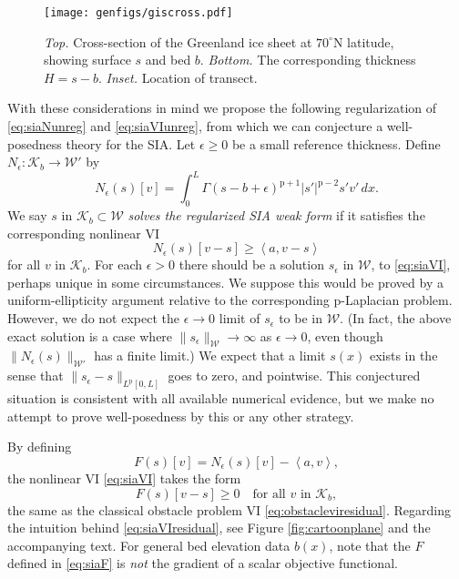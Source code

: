 \documentclass[letterpaper,final,12pt,reqno]{amsart}
\theoremstyle{claim}
\newcommand{\eps}{\epsilon}
\newcommand{\ip}[2]{\left<#1,#2\right>}
\newcommand{\pp}{{\text{p}}}
\numberwithin{equation}{section}
\numberwithin{figure}{section}
\numberwithin{table}{section}
\numberwithin{theorem}{section}
\begin{document}
\begin{figure}
\texttt{[image: genfigs/giscross.pdf]}
\caption{\emph{Top.}  Cross-section of the Greenland ice sheet at $70^\circ$N latitude, showing surface $s$ and bed $b$.  \emph{Bottom.} The corresponding thickness $H=s-b$.  \emph{Inset.} Location of transect.}
\label{fig:giscross}
\end{figure}

With these considerations in mind we propose the following regularization of \eqref{eq:siaNunreg} and \eqref{eq:siaVIunreg}, from which we can conjecture a well-posedness theory for the SIA.  Let $\eps \ge 0$ be a small reference thickness.  Define $N_\eps:\mathcal{K}_b \to \mathcal{W}'$ by
\begin{equation}
N_\eps(s)[v] = \int_0^L \Gamma (s-b+\eps)^{\pp+1} |s'|^{\pp-2} s' v'\,dx. \label{eq:siaN}
\end{equation}
We say $s$ in $\mathcal{K}_b \subset \mathcal{W}$ \emph{solves the regularized SIA weak form} if it satisfies the corresponding nonlinear VI
\begin{equation}
N_\eps(s)[v-s] \ge \ip{a}{v-s} \label{eq:siaVI}
\end{equation}
for all $v$ in $\mathcal{K}_b$.  For each $\eps>0$ there should be a solution $s_\eps$ in $\mathcal{W}$, to \eqref{eq:siaVI}, perhaps unique in some circumstances.  We suppose this would be proved by a uniform-ellipticity argument relative to the corresponding $\pp$-Laplacian problem.  However, we do not expect the $\eps\to 0$ limit of $s_\eps$ to be in $\mathcal{W}$.  (In fact, the above exact solution is a case where $\|s_\eps\|_{\mathcal{W}} \to \infty$ as $\eps\to 0$, even though $\|N_\eps(s)\|_{\mathcal{W}'}$ has a finite limit.)  We expect that a limit $s(x)$ exists in the sense that $\|s_\eps-s\|_{L^\pp[0,L]}$ goes to zero, and pointwise.  This conjectured situation is consistent with all available numerical evidence, but we make no attempt to prove well-posedness by this or any other strategy.

By defining
\begin{equation}
F(s)[v] = N_\eps(s)[v] - \ip{a}{v}, \label{eq:siaF}
\end{equation}
the nonlinear VI \eqref{eq:siaVI} takes the form
\begin{equation}
F(s)[v-s] \ge 0 \quad \text{for all } v \text{ in } \mathcal{K}_b, \label{eq:siaVIresidual}
\end{equation}
the same as the classical obstacle problem VI \eqref{eq:obstacleviresidual}.  Regarding the intuition behind \eqref{eq:siaVIresidual}, see Figure \ref{fig:cartoonplane} and the accompanying text.  For general bed elevation data $b(x)$, note that the $F$ defined in \eqref{eq:siaF} is \emph{not} the gradient of a scalar objective functional.
\end{document}
